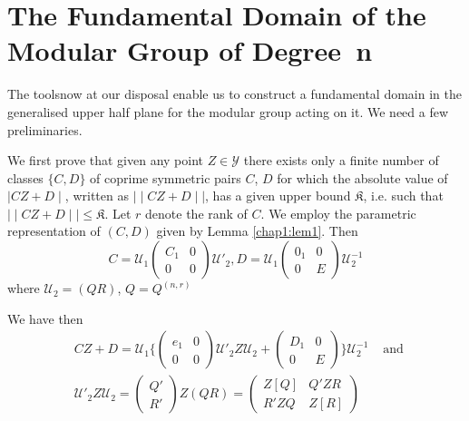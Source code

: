 \chapter{The Fundamental Domain of the Modular Group of Degree~n}%
 
The tools\pageoriginale now at our disposal enable us to construct a
fundamental 
domain in the generalised upper half plane for the  modular group
acting on it. We need a few  preliminaries.  
 
 We first prove that given any point $ Z \in \mathscr{Y} $ there
 exists only a finite number of classes $ \{ C, D \} $ of  coprime
 symmetric pairs  $C$, $D$ for  which the absolute value of $ \mid CZ
 + D \mid$, written as $\mid\mid CZ + D \mid\mid$, has a given upper
 bound $\mathfrak{K}$, i.e. such that $\mid\mid CZ + D\mid\mid \leq
 \mathfrak{K}$. Let $r$ denote the rank of $C$. We employ the
 parametric representation of $(C, D)$ given by Lemma
 \ref{chap1:lem1}. Then    
 \begin{equation*}
C = \mathcal{U}_1 
\begin{pmatrix} 
C_1 & 0 \\
 0 & 0
 \end{pmatrix}
\mathcal{U}'_2,  D = \mathcal{U}_1  
\begin{pmatrix}
 0_1 & 0 \\ 
0 &  E
 \end{pmatrix}
 \mathcal{U}^{-1}_{2} \tag{68}\label{eq68} 
 \end{equation*} 
where $ \mathcal{U}_2 = ( Q R )$, $Q = Q^{(n,r)} $

We have then 
\begin{align*} 
 &CZ + D = \mathcal{U}_1 \bigg\{
 \begin{pmatrix}
 e_1 & 0 \\ 
0 & 0 
\end{pmatrix} 
\mathcal{U}'_2 Z \mathcal{U}_2 + 
\begin{pmatrix}
   D_1 & 0 \\
 0 & E 
\end{pmatrix} \bigg\} 
\mathcal{U}^{-1}_2   &\text{ and } \\ 
 &\mathcal{U}'_2 Z \mathcal{U}_2 =
  \begin{pmatrix}
Q'  \\
 R'
\end{pmatrix}
 Z ( Q R ) =  
\begin{pmatrix}
 Z[ Q ] & Q' Z R\\
 R'Z Q & Z[ R ]
 \end{pmatrix}  
\end{align*}

